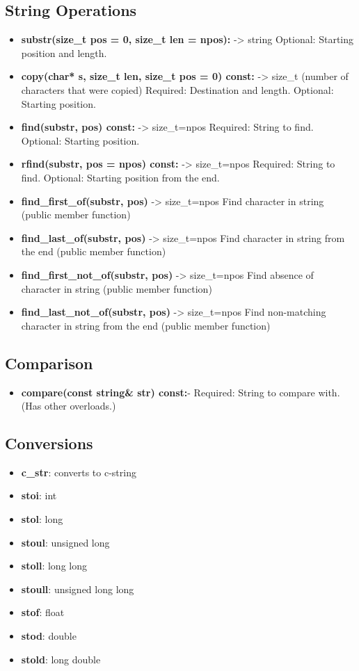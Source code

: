 \documentclass{report}
\begin{document}
    \pagebreak \bigbreak \noindent 
    \subsection{String Operations}
    \begin{itemize}
        \item \textbf{substr(size\_t \textbf{pos = 0, size\_t len = npos):}} -> string Optional: Starting position and length.
        \item \textbf{copy(char* s, size\_t len, size\_t pos = 0) const:} -> size\_t (number of characters that were copied) Required: Destination and length. Optional: Starting position.
        \item \textbf{find(substr, pos) const:} -> size\_t=npos Required: String to find. Optional: Starting position.
        \item \textbf{rfind(substr, pos = npos) const:} -> size\_t=npos Required: String to find. Optional: Starting position from the end.
        \item \textbf{find\_first\_of(substr, pos)} -> size\_t=npos Find character in string (public member function)
        \item \textbf{find\_last\_of(substr, pos)} -> size\_t=npos	Find character in string from the end (public member function)
        \item \textbf{find\_first\_not\_of(substr, pos)} -> size\_t=npos	Find absence of character in string (public member function)
        \item \textbf{find\_last\_not\_of(substr, pos)} -> size\_t=npos	Find non-matching character in string from the end (public member function)
    \end{itemize}
    \bigbreak \noindent 
    \subsection{Comparison}
    \begin{itemize}
        \item \textbf{compare(const string\& str) const:}- Required: String to compare with. (Has other overloads.)
    \end{itemize}

    \bigbreak \noindent 
    \subsection{Conversions}
    \begin{itemize}
        \item \textbf{c\_str}: converts to c-string
        \item \textbf{stoi}: int
        \item \textbf{stol}: long
        \item \textbf{stoul}: unsigned long
        \item \textbf{stoll}: long long
        \item \textbf{stoull}: unsigned long long
        \item \textbf{stof}: float
        \item \textbf{stod}: double
        \item \textbf{stold}: long double
    \end{itemize}
\end{document}
